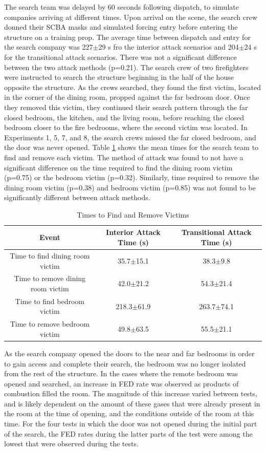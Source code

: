 \documentclass[12pt,oneside]{article}
\begin{document}
The search team was delayed by 60 seconds following dispatch, to simulate companies arriving at different times. Upon arrival on the scene, the search crew donned their SCBA masks and simulated forcing entry before entering the structure on a training prop. The average time between dispatch and entry for the search company was 227$\pm$29 s fro the interior attack scenarios and 204$\pm$24 s for the transitional attack scenarios. There was not a significant difference between the two attack methods (p=0.21). The search crew of two firefighters were instructed to search the structure beginning in the half of the house opposite the structure. As the crews searched, they found the first victim, located in the corner of the dining room, propped against the far bedroom door. Once they removed this victim, they continued their search pattern through the far closed bedroom, the kitchen, and the living room, before reaching the closed bedroom closer to the fire bedrooms, where the second victim was located. In Experiments 1, 5, 7, and 8, the search crews missed the far closed bedroom, and the door was never opened. Table \ref{tab:victim_times} shows the mean times for the search team to find and remove each victim. The method of attack was found to not have a significant difference on the time required to find the dining room victim (p=0.75) or the bedroom victim (p=0.32). Similarly, time required to remove the dining room victim (p=0.38) and bedroom victim (p=0.85) was not found to be significantly different between attack methods. 

\begin{table}[!ht]
    \centering
    \caption{Times to Find and Remove Victims}
    \label{tab:victim_times}
    \begin{tabular}{ccc}
    \toprule[1.5pt]
 	 Event&								Interior Attack Time (s)&	Transitional Attack Time (s)\\
 	\midrule 
  	Time to find dining room victim&	35.7$\pm$15.1&				38.3$\pm$9.8\\
  	Time to remove dining room victim&	42.0$\pm$21.2&				54.3$\pm$21.4\\
  	Time to find bedroom victim&		218.3$\pm$61.9&				263.7$\pm$74.1\\
  	Time to remove bedroom victim&		49.8$\pm$63.5&				55.5$\pm$21.1\\
 	\bottomrule[1.25pt] 
    \end{tabular}
\end{table}

As the search company opened the doors to the near and far bedrooms in order to gain access and complete their search, the bedroom was no longer isolated from the rest of the structure. In the cases where the remote bedroom was opened and searched, an increase in FED rate was observed as products of combustion filled the room. The magnitude of this increase varied between tests, and is likely dependent on the amount of these gases that were already present in the room at the time of opening, and the conditions outside of the room at this time.  For the four tests in which the door was not opened during the initial part of the search, the FED rates during the latter parts of the test were among the lowest that were observed during the tests. 
\end{document}
